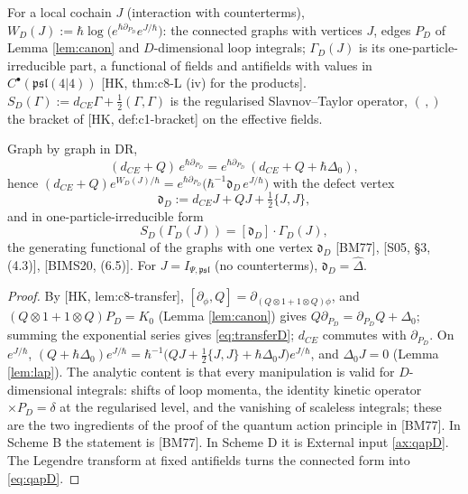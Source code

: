\begin{definition}
\label{def:WD}
For a local cochain $J$ (interaction with counterterms), $W_D(J):=\hbar\log\big(e^{\hbar\partial_{P_D}}e^{J/\hbar}\big)$: the connected graphs with vertices $J$, edges $P_D$ of Lemma \ref{lem:canon} and $D$-dimensional loop integrals; $\Gamma_D(J)$ is its one-particle-irreducible part, a functional of fields and antifields with values in $C^\bullet(\mathfrak{psl}(4|4))$ [HK, thm:c8-L (iv) for the products]. $S_D(\Gamma):=d_{CE}\Gamma+\frac12(\Gamma,\Gamma)$ is the regularised Slavnov--Taylor operator, $(\,,)$ the bracket of [HK, def:c1-bracket] on the effective fields.
\end{definition}

\begin{theorem}
\label{thm:qap}
Graph by graph in DR,
\begin{equation}
(d_{CE}+Q)\,e^{\hbar\partial_{P_D}}=e^{\hbar\partial_{P_D}}\,(d_{CE}+Q+\hbar\Delta_0),
\label{eq:transferD}
\end{equation}
hence $(d_{CE}+Q)e^{W_D(J)/\hbar}=e^{\hbar\partial_{P_D}}\big(\hbar^{-1}\mathfrak d_D\,e^{J/\hbar}\big)$ with the defect vertex
\[
\mathfrak d_D:=d_{CE}J+QJ+\tfrac12\{J,J\},
\]
and in one-particle-irreducible form
\begin{equation}
S_D(\Gamma_D(J))=[\mathfrak d_D]\cdot\Gamma_D(J),
\label{eq:qapD}
\end{equation}
the generating functional of the graphs with one vertex $\mathfrak d_D$ [BM77], [S05, §3, (4.3)], [BIMS20, (6.5)]. For $J=I_{\Psi,\mathfrak{psl}}$ (no counterterms), $\mathfrak d_D=\widehat\Delta$.
\end{theorem}

\begin{proof}
By [HK, lem:c8-transfer], $[\partial_\phi,Q]=\partial_{(Q\otimes1+1\otimes Q)\phi}$, and $(Q\otimes1+1\otimes Q)P_D=K_0$ (Lemma \ref{lem:canon}) gives $Q\partial_{P_D}=\partial_{P_D}Q+\Delta_0$; summing the exponential series gives \eqref{eq:transferD}; $d_{CE}$ commutes with $\partial_{P_D}$. On $e^{J/\hbar}$, $(Q+\hbar\Delta_0)e^{J/\hbar}=\hbar^{-1}\big(QJ+\frac12\{J,J\}+\hbar\Delta_0J\big)e^{J/\hbar}$, and $\Delta_0J=0$ (Lemma \ref{lem:lap}). The analytic content is that every manipulation is valid for $D$-dimensional integrals: shifts of loop momenta, the identity kinetic operator $\times P_D=\delta$ at the regularised level, and the vanishing of scaleless integrals; these are the two ingredients of the proof of the quantum action principle in [BM77]. In Scheme B the statement is [BM77]. In Scheme D it is External input \ref{ax:qapD}. The Legendre transform at fixed antifields turns the connected form into \eqref{eq:qapD}.
\end{proof}

